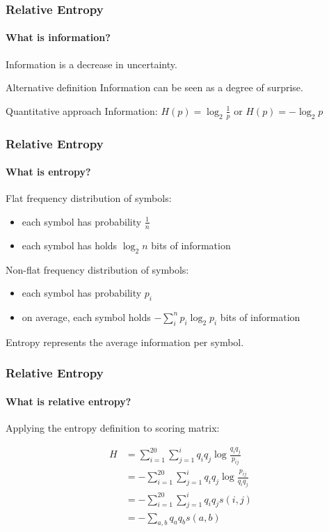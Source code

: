 \documentclass{beamer}
\begin{document}
\begin{frame}
  \frametitle{Relative Entropy}
  \framesubtitle{What is information?}

  \begin{definition}
    \alert{Information} is a decrease in uncertainty.
  \end{definition}
  \begin{block}{Alternative definition}
    \alert{Information} can be seen as a degree of surprise.
  \end{block}

  \pause

  \begin{block}{Quantitative approach}
    \alert{Information}: $H(p)=\log_{2} \frac{1}{p}$ or $H(p)=-\log_{2}{p}$
  \end{block}
\end{frame}

\begin{frame}
  \frametitle{Relative Entropy}
  \framesubtitle{What is entropy?}

  Flat frequency distribution of symbols:
  \begin{itemize}
    \item each symbol has probability $\frac{1}{n}$
    \item each symbol has holds $\log_{2}{n}$ bits of information
  \end{itemize}

  Non-flat frequency distribution of symbols:
  \begin{itemize}
    \item each symbol has probability $p_i$
    \item \alert{on average}, each symbol holds $-\displaystyle \sum_i^n p_i \log_2 p_i$ bits of information
  \end{itemize}

  \pause

  \begin{definition}
    \alert{Entropy} represents the average information per symbol.
  \end{definition}
\end{frame}

\begin{frame}
  \frametitle{Relative Entropy}
  \framesubtitle{What is relative entropy?}

  Applying the entropy definition to scoring matrix:
  
  \begin{displaymath}
    \begin{split}
      H & = \sum_{i=1}^{20} \sum_{j=1}^i q_i q_j \log \frac{q_i q_j}{p_{ij}}\\
        & = -\sum_{i=1}^{20} \sum_{j=1}^i q_i q_j \log \frac{p_{ij}}{q_i q_j}\\
        & = -\sum_{i=1}^{20} \sum_{j=1}^i q_i q_j s(i,j)\\
	& = -\sum_{a,b} q_a q_b s(a,b)
    \end{split}
  \end{displaymath}

\end{frame}
\end{document}
